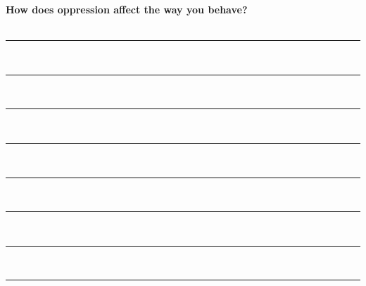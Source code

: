 \newpage
\noindent
\textcolor{ProcessBlue}{\textbf{\Large{How does oppression affect the way you behave?}}}\\\\
\noindent\rule{\textwidth}{1pt}\\
\noindent\rule{\textwidth}{1pt}\\
\noindent\rule{\textwidth}{1pt}\\
\noindent\rule{\textwidth}{1pt}\\
\noindent\rule{\textwidth}{1pt}\\
\noindent\rule{\textwidth}{1pt}\\
\noindent\rule{\textwidth}{1pt}\\
\noindent\rule{\textwidth}{1pt}\\\\

